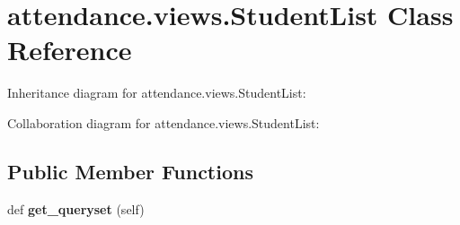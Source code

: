 \hypertarget{classattendance_1_1views_1_1_student_list}{}\section{attendance.\+views.\+Student\+List Class Reference}
\label{classattendance_1_1views_1_1_student_list}


Inheritance diagram for attendance.\+views.\+Student\+List\+:


Collaboration diagram for attendance.\+views.\+Student\+List\+:
\subsection*{Public Member Functions}
\begin{DoxyCompactItemize}
\item 
\hypertarget{classattendance_1_1views_1_1_student_list_ae57a31a82abc52807b167d7f58f9440e}{}\label{classattendance_1_1views_1_1_student_list_ae57a31a82abc52807b167d7f58f9440e} 
def {\bfseries get\+\_\+queryset} (self)
\end{DoxyCompactItemize}
